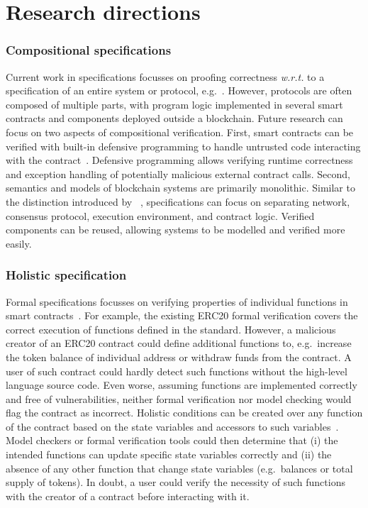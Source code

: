 \section{Research directions}
\label{discuss}

\subsubsection{Compositional specifications}
Current work in specifications focusses on proofing correctness \emph{w.r.t.} to a specification of an entire system or protocol, e.g.~\cite{Pirlea2018}.
However, protocols are often composed of multiple parts, with program logic implemented in several smart contracts and components deployed outside a blockchain.
Future research can focus on two aspects of compositional verification.
First, smart contracts can be verified with built-in defensive programming to handle untrusted code interacting with the contract~\cite{Miller2018smart}.
Defensive programming allows verifying runtime correctness and exception handling of potentially malicious external contract calls.
Second, semantics and models of blockchain systems are primarily monolithic.
Similar to the distinction introduced by \citeauthor{Bonneau2015}~\cite{Bonneau2015}, specifications can focus on separating network, consensus protocol, execution environment, and contract logic.
Verified components can be reused, allowing systems to be modelled and verified more easily.

\subsubsection{Holistic specification}
Formal specifications focusses on verifying properties of individual functions in smart contracts~\cite{Hildenbrandt2017}.
For example, the existing ERC20 formal verification covers the correct execution of functions defined in the standard.
However, a malicious creator of an ERC20 contract could define additional functions to, e.g.\ increase the token balance of individual address or withdraw funds from the contract.
A user of such contract could hardly detect such functions without the high-level language source code.
Even worse, assuming functions are implemented correctly and free of vulnerabilities, neither formal verification nor model checking would flag the contract as incorrect.
Holistic conditions can be created over any function of the contract based on the state variables and accessors to such variables~\cite{Drossopoulou2018}.
Model checkers or formal verification tools could then determine that (i) the intended functions can update specific state variables correctly and (ii) the absence of any other function that change state variables (e.g.\ balances or total supply of tokens).
In doubt, a user could verify the necessity of such functions with the creator of a contract before interacting with it.

